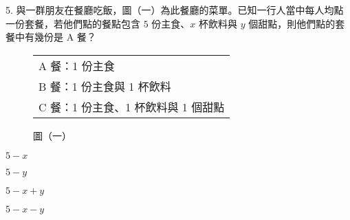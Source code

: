 \documentclass[12pt]{article}
\begin{document}
\begin{problem}
  \item[5.] 與一群朋友在餐廳吃飯，圖（一）為此餐廳的菜單。已知一行人當中每人均點一份套餐，若他們點的餐點包含 $5$ 份主食、$x$ 杯飲料與 $y$ 個甜點，則他們點的套餐中有幾份是 A 餐？
  \begin{figure}[ht]
    \centering\footnotesize
    \begin{tabular}{|l|}
      \hline
      A 餐：1 份主食 \\
      B 餐：1 份主食與 1 杯飲料 \\
      C 餐：1 份主食、1 杯飲料與 1 個甜點 \\ \hline
    \end{tabular}
    \vspace*{-1ex}
    \caption*{圖（一）}
    \vspace*{-3ex}
  \end{figure}
  \begin{choices}
    \item $5 - x$
    \item $5 - y$
    \item $5 - x + y$
    \item $5 - x - y$
  \end{choices}
\end{problem}
\end{document}
